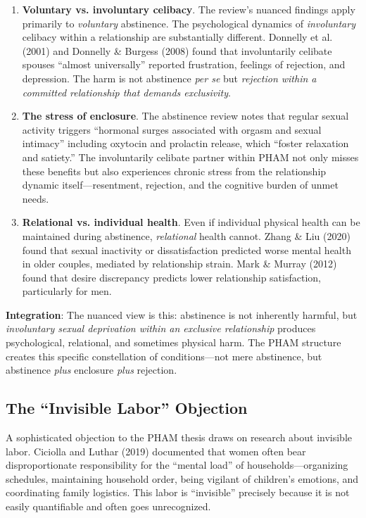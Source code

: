 \documentclass[12pt, letterpaper]{article}
\begin{document}
\begin{enumerate}
    \item \textbf{Voluntary vs. involuntary celibacy}. The review's nuanced findings apply primarily to \textit{voluntary} abstinence. The psychological dynamics of \textit{involuntary} celibacy within a relationship are substantially different. Donnelly et al. (2001) and Donnelly \& Burgess (2008) found that involuntarily celibate spouses ``almost universally'' reported frustration, feelings of rejection, and depression. The harm is not abstinence \textit{per se} but \textit{rejection within a committed relationship that demands exclusivity}.
    
    \item \textbf{The stress of enclosure}. The abstinence review notes that regular sexual activity triggers ``hormonal surges associated with orgasm and sexual intimacy'' including oxytocin and prolactin release, which ``foster relaxation and satiety.'' The involuntarily celibate partner within PHAM not only misses these benefits but also experiences chronic stress from the relationship dynamic itself---resentment, rejection, and the cognitive burden of unmet needs.
    
    \item \textbf{Relational vs. individual health}. Even if individual physical health can be maintained during abstinence, \textit{relational} health cannot. Zhang \& Liu (2020) found that sexual inactivity or dissatisfaction predicted worse mental health in older couples, mediated by relationship strain. Mark \& Murray (2012) found that desire discrepancy predicts lower relationship satisfaction, particularly for men.
\end{enumerate}

\textbf{Integration}: The nuanced view is this: abstinence is not inherently harmful, but \textit{involuntary sexual deprivation within an exclusive relationship} produces psychological, relational, and sometimes physical harm. The PHAM structure creates this specific constellation of conditions---not mere abstinence, but abstinence \textit{plus} enclosure \textit{plus} rejection.

\subsection{The ``Invisible Labor'' Objection}

A sophisticated objection to the PHAM thesis draws on research about invisible labor. Ciciolla and Luthar (2019) documented that women often bear disproportionate responsibility for the ``mental load'' of households---organizing schedules, maintaining household order, being vigilant of children's emotions, and coordinating family logistics. This labor is ``invisible'' precisely because it is not easily quantifiable and often goes unrecognized.
\end{document}
